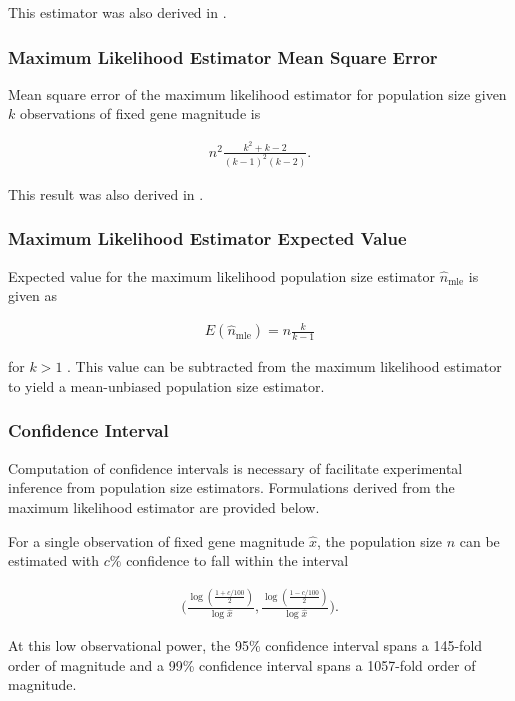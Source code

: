 This estimator was also derived in \citep{varagnolo2010distributed}.

\subsubsection{Maximum Likelihood Estimator Mean Square Error}

Mean square error of the maximum likelihood estimator for population size given $k$ observations of fixed gene magnitude is

\begin{align*}
n^2 \frac{k^{2}+ k-2}{(k-1)^{2}(k-2)}.
\end{align*}

This result was also derived in \citep{varagnolo2010distributed}.

\subsubsection{Maximum Likelihood Estimator Expected Value}

Expected value for the maximum likelihood population size estimator $\hat{n}_\mathrm{mle}$ is given as

\begin{align*}
E(\hat{n}_\mathrm{mle})
= n\frac{k}{k-1}
\end{align*}

for $k>1$ \citep{varagnolo2010distributed}.
This value can be subtracted from the maximum likelihood estimator to yield a mean-unbiased population size estimator.

\subsubsection{Confidence Interval}

Computation of confidence intervals is necessary of facilitate experimental inference from population size estimators.
Formulations derived from the maximum likelihood estimator are provided below.

For a single observation of fixed gene magnitude $\hat{x}$, the population size $n$ can be estimated with $c\%$ confidence to fall within the interval

\begin{align*}
\Big(
\frac{\log(\frac{1+c/100}{2})}{\log\hat{x}},
\frac{\log(\frac{1-c/100}{2})}{\log\hat{x}}
\Big).
\end{align*}

At this low observational power, the 95\% confidence interval spans a 145-fold order of magnitude and a 99\% confidence interval spans a 1057-fold order of magnitude.

